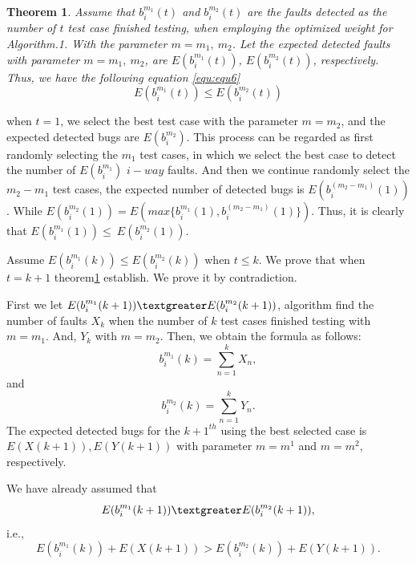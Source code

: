 \documentclass[10pt,conference, compsocconf]{IEEEtran}
\newtheorem{thm}{Theorem}[section]
\begin{document}
\begin{CJK}{UTF8}{gkai}
\begin{thm}
\label{thm:thm3}
Assume that $b_i^{m_1}(t)$ and $b_i^{m_2}(t)$ are the faults detected
as the number of $t$ test case finished testing, 
when employing the optimized weight for Algorithm.1.
With the parameter $m=m_1,\ m_2$.
Let the expected detected faults with parameter $m=m_1,\ m_2$,
are $E(b_i^{m_1}(t))$, $E(b_i^{m_2}(t))$, respectively.
Thus, we have the following equation \ref{equ:equ6}
\begin{equation} 
\label{equ:equ6}
E(b_i^{m_1}(t)) \leq E(b_i^{m_2}(t))
\end{equation}
\end{thm}

when $t=1$, we select the best test case with the parameter $m=m_2$,
and the expected detected bugs are $E(b_i^{m_2})$. 
This process can be regarded as first randomly selecting the $m_1$ test
cases, in which we select the best case to detect the number of
$E(b_i^{m_1})$ $i-way$ faults.
And then we continue randomly select the $m_2-m_1$ test cases,
the expected number of detected bugs is $E(b_i^{(m_2-m_1)}(1))$.
While $E(b_i^{m_2}(1))=E(max\{b_i^{m_1}(1),b_i^{(m_2-m_1)}(1)\})$.
Thus, it is clearly that $E(b_i^{m_1}(1)) \leq\  E(b_i^{m_2}(1))$.

Assume $E(b_i^{m_1}(k)) \leq E(b_i^{m_2}(k))$ when $t\leq k$. 
We prove that when $t=k+1$ theorem\ref{thm:thm3} establish. 
We prove it by contradiction. 

First we let $E(b_i^{m_1}(k+1))\textgreater E(b_i^{m_2}(k+1))$,
algorithm find the number of faults 
$X_k$ when the number of $k$ test cases finished testing with $m={m_1}$.
And, $Y_k$ with $m=m_2$.
Then, we obtain the formula as follows: 
$$b_i^{m_1}(k)=\sum_{n=1}^{k}X_n,$$ and $$b_i^{m_2}(k)=\sum_{n=1}^{k}Y_n.$$
The expected detected bugs for the ${k+1}^{th}$ using the 
best selected case is $E(X(k+1)),E(Y(k+1))$ with 
parameter $m=m^1$ and $m=m^2$, respectively. 

We have already assumed that
$$E(b_i^{m_1}(k+1))\textgreater E(b_i^{m_2}(k+1)),$$i.e., 
$$E(b_i^{m_1}(k))+E(X(k+1)) > E(b_i^{m_2}(k))+E(Y(k+1)).$$


\end{CJK}
\end{document}

